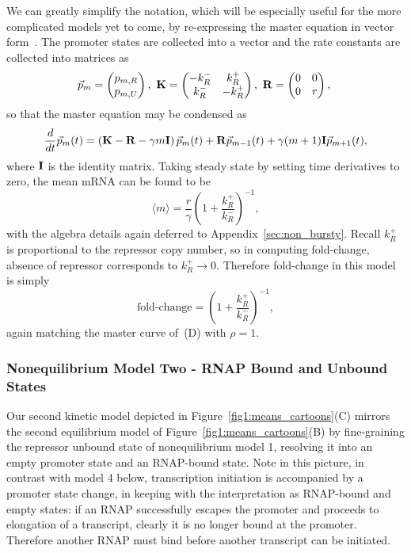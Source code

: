 We can greatly simplify the notation, which will be especially useful for the
more complicated models yet to come, by re-expressing the master equation in
vector form~\cite{Phillips2012}. The promoter states are collected into a vector
and the rate constants are collected into matrices as
\begin{equation}
\vec{p}_m = \begin{pmatrix} p_{m,R} \\ p_{m,U} \end{pmatrix},\
\mathbf{K} = \begin{pmatrix} -k_R^- & k_R^+ \\ k_R^- & -k_R^+ \end{pmatrix},\
\mathbf{R} = \begin{pmatrix} 0 & 0 \\ 0 & r \end{pmatrix},\
\label{eq:2state_cme_matrices}
\end{equation}
so that the master equation may be condensed as
\begin{equation}
\frac{d {}}{d t}\vec{p}_m(t) =
\left( \mathbf{K} - \mathbf{R} - \gamma m \mathbf{I} \right) \vec{p}_m(t)
                + \mathbf{R} \vec{p}_{m-1}(t)
                + \gamma (m+1) \mathbf{I} \vec{p}_{m+1}(t),
\label{eq:2state_rep_cme}
\end{equation}
where $\mathbf{I}$ is the identity matrix. Taking steady state by setting time
derivatives to zero, the mean mRNA can be found to be
\begin{equation}
\langle m \rangle = \frac{r}{\gamma}
        \left(1 + \frac{k_R^+}{k_R^-}\right)^{-1},
\end{equation}
with the algebra details again deferred to Appendix~\ref{sec:non_bursty}. Recall
$k_R^+$ is proportional to the repressor copy number, so in computing
fold-change, absence of repressor corresponds to $k_R^+\rightarrow0$. Therefore
fold-change in this model is simply
\begin{equation}
\text{fold-change} = \left(1 + \frac{k_R^+}{k_R^-}\right)^{-1},
\end{equation}
again matching the master curve of~(D) with $\rho=1$.

\subsubsection{Nonequilibrium Model Two - RNAP Bound and Unbound States}
Our second kinetic model depicted in Figure~\ref{fig1:means_cartoons}(C) mirrors
the second equilibrium model of Figure~\ref{fig1:means_cartoons}(B) by
fine-graining  the repressor unbound state of nonequilibrium model 1, resolving
it into an empty promoter state and an RNAP-bound state. Note in this picture,
in contrast with model 4 below, transcription initiation is accompanied by a
promoter state change, in keeping with the interpretation as RNAP-bound and
empty states: if an RNAP successfully escapes the promoter and proceeds to
elongation of a transcript, clearly it is no longer bound at the promoter.
Therefore another RNAP must bind before another transcript can be initiated.

